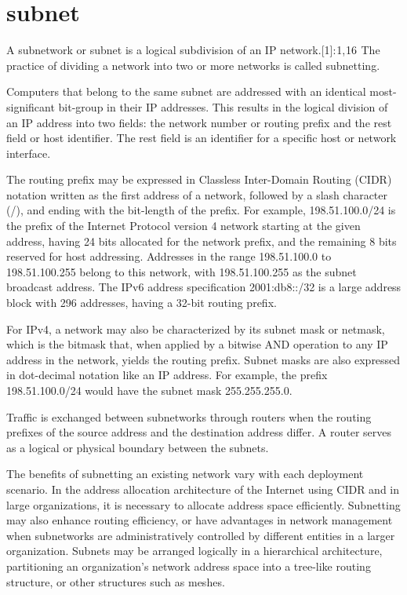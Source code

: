 \documentclass[a4paper,12pt]{article}
\begin{document}
\section{subnet}
A subnetwork or subnet is a logical subdivision of an IP network.[1]: 1, 16  The practice of dividing a network into two or more networks is called subnetting.

Computers that belong to the same subnet are addressed with an identical most-significant bit-group in their IP addresses. This results in the logical division of an IP address into two fields: the network number or routing prefix and the rest field or host identifier. The rest field is an identifier for a specific host or network interface.

The routing prefix may be expressed in Classless Inter-Domain Routing (CIDR) notation written as the first address of a network, followed by a slash character (/), and ending with the bit-length of the prefix. For example, 198.51.100.0/24 is the prefix of the Internet Protocol version 4 network starting at the given address, having 24 bits allocated for the network prefix, and the remaining 8 bits reserved for host addressing. Addresses in the range 198.51.100.0 to 198.51.100.255 belong to this network, with 198.51.100.255 as the subnet broadcast address. The IPv6 address specification 2001:db8::/32 is a large address block with 296 addresses, having a 32-bit routing prefix.

For IPv4, a network may also be characterized by its subnet mask or netmask, which is the bitmask that, when applied by a bitwise AND operation to any IP address in the network, yields the routing prefix. Subnet masks are also expressed in dot-decimal notation like an IP address. For example, the prefix 198.51.100.0/24 would have the subnet mask 255.255.255.0.

Traffic is exchanged between subnetworks through routers when the routing prefixes of the source address and the destination address differ. A router serves as a logical or physical boundary between the subnets.

The benefits of subnetting an existing network vary with each deployment scenario. In the address allocation architecture of the Internet using CIDR and in large organizations, it is necessary to allocate address space efficiently. Subnetting may also enhance routing efficiency, or have advantages in network management when subnetworks are administratively controlled by different entities in a larger organization. Subnets may be arranged logically in a hierarchical architecture, partitioning an organization's network address space into a tree-like routing structure, or other structures such as meshes.
\end{document}
